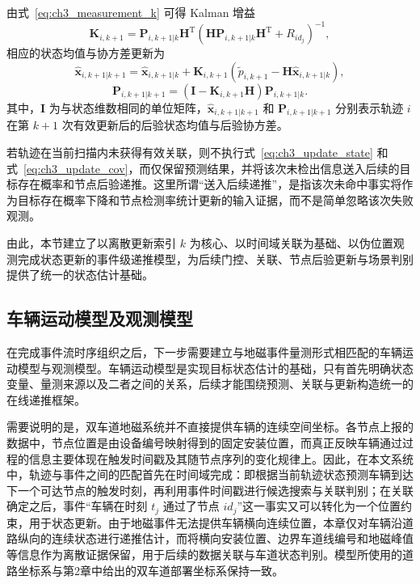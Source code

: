 \documentclass{xdupgthesis}
\begin{document}
由式~\eqref{eq:ch3_measurement_k} 可得 Kalman 增益
\begin{equation}
	\mathbf K_{i,k+1}
	=
	\mathbf P_{i,k+1|k}\mathbf H^{\mathrm T}
	\left(
	\mathbf H\mathbf P_{i,k+1|k}\mathbf H^{\mathrm T}
	+
	R_{id_j}
	\right)^{-1},
	\label{eq:ch3_K}
\end{equation}
相应的状态均值与协方差更新为
\begin{equation}
	\hat{\mathbf x}_{i,k+1|k+1}
	=
	\hat{\mathbf x}_{i,k+1|k}
	+
	\mathbf K_{i,k+1}
	\left(
	\tilde p_{i,k+1}
	-
	\mathbf H\hat{\mathbf x}_{i,k+1|k}
	\right),
	\label{eq:ch3_update_state}
\end{equation}
\begin{equation}
	\mathbf P_{i,k+1|k+1}
	=
	\left(
	\mathbf I-\mathbf K_{i,k+1}\mathbf H
	\right)\mathbf P_{i,k+1|k}.
	\label{eq:ch3_update_cov}
\end{equation}
其中，$\mathbf I$ 为与状态维数相同的单位矩阵，$\hat{\mathbf x}_{i,k+1|k+1}$ 和 $\mathbf P_{i,k+1|k+1}$ 分别表示轨迹 $i$ 在第 $k+1$ 次有效更新后的后验状态均值与后验协方差。

若轨迹在当前扫描内未获得有效关联，则不执行式~\eqref{eq:ch3_update_state} 和式~\eqref{eq:ch3_update_cov}，而仅保留预测结果，并将该次未检出信息送入后续的目标存在概率和节点后验递推。这里所谓“送入后续递推”，是指该次未命中事实将作为目标存在概率下降和节点检测率统计更新的输入证据，而不是简单忽略该次失败观测。

由此，本节建立了以离散更新索引 $k$ 为核心、以时间域关联为基础、以伪位置观测完成状态更新的事件级递推模型，为后续门控、关联、节点后验更新与场景判别提供了统一的状态估计基础。

\subsection{车辆运动模型及观测模型}

在完成事件流时序组织之后，下一步需要建立与地磁事件量测形式相匹配的车辆运动模型与观测模型。车辆运动模型是实现目标状态估计的基础，只有首先明确状态变量、量测来源以及二者之间的关系，后续才能围绕预测、关联与更新构造统一的在线递推框架。

需要说明的是，双车道地磁系统并不直接提供车辆的连续空间坐标。各节点上报的数据中，节点位置是由设备编号映射得到的固定安装位置，而真正反映车辆通过过程的信息主要体现在触发时间戳及其随节点序列的变化规律上。因此，在本文系统中，轨迹与事件之间的匹配首先在时间域完成：即根据当前轨迹状态预测车辆到达下一个可达节点的触发时刻，再利用事件时间戳进行候选搜索与关联判别；在关联确定之后，事件“车辆在时刻 $t_j$ 通过了节点 $id_j$”这一事实又可以转化为一个位置约束，用于状态更新。由于地磁事件无法提供车辆横向连续位置，本章仅对车辆沿道路纵向的连续状态进行递推估计，而将横向安装位置、边界车道线编号和地磁峰值等信息作为离散证据保留，用于后续的数据关联与车道状态判别。模型所使用的道路坐标系与第2章中给出的双车道部署坐标系保持一致。
\end{document}
